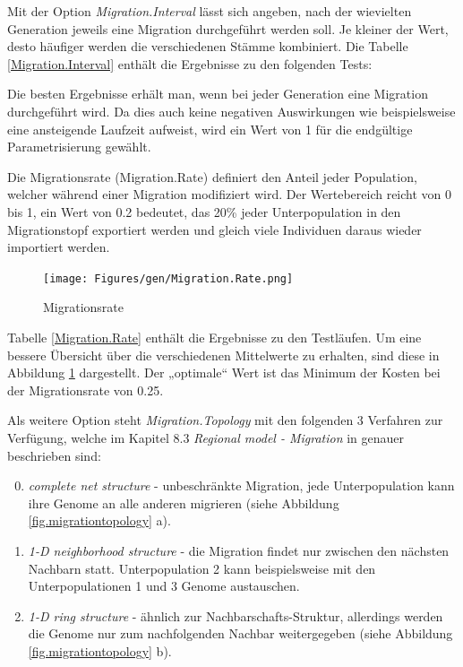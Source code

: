 
Mit der Option \emph{Migration.Interval} lässt sich angeben, nach der wievielten
Generation jeweils eine Migration durchgeführt werden soll. Je kleiner der Wert,
desto häufiger werden die verschiedenen Stämme kombiniert. Die Tabelle
\ref{Migration.Interval} enthält die Ergebnisse zu den folgenden Tests:




\noindent Die besten Ergebnisse erhält man, wenn bei jeder Generation eine
Migration durchgeführt wird. Da dies auch keine negativen Auswirkungen wie
beispielsweise eine ansteigende Laufzeit aufweist, wird ein Wert von 1 für die
endgültige Parametrisierung gewählt.


Die Migrationsrate (Migration.Rate) definiert den Anteil jeder Population, welcher
während einer Migration modifiziert wird. Der Wertebereich reicht von 0 bis 1,
ein Wert von 0.2 bedeutet, das 20\% jeder Unterpopulation in den Migrationstopf
exportiert werden und gleich viele Individuen daraus wieder importiert werden.


\begin{figure}[h!]
  \centering
  \texttt{[image: Figures/gen/Migration.Rate.png]}
  \caption{Migrationsrate}\label{fig.migrationrate}
\end{figure}

\noindent Tabelle \ref{Migration.Rate} enthält die Ergebnisse zu den Testläufen.
Um eine bessere Übersicht über die verschiedenen Mittelwerte zu erhalten, sind
diese in Abbildung \ref{fig.migrationrate} dargestellt. Der „optimale“ Wert
ist das Minimum der Kosten bei der Migrationsrate von 0.25.


Als weitere Option steht \emph{Migration.Topology} mit den folgenden 3 Verfahren
zur Verfügung, welche im Kapitel 8.3 \emph{Regional model - Migration} in
\citep{geatbx-ea} genauer beschrieben sind:
\begin{enumerate}
\setcounter{enumi}{-1} %
\item \emph{complete net structure} - unbeschränkte Migration, jede
      Unterpopulation kann ihre Genome an alle anderen migrieren (siehe Abbildung
      \ref{fig.migrationtopology} a).
\item \emph{1-D neighborhood structure} - die Migration findet nur zwischen den
      nächsten Nachbarn statt. Unterpopulation 2 kann beispielsweise mit den
      Unterpopulationen 1 und 3 Genome austauschen.
\item \emph{1-D ring structure} - ähnlich zur Nachbarschafts-Struktur, allerdings
      werden die Genome nur zum nachfolgenden Nachbar weitergegeben (siehe Abbildung
      \ref{fig.migrationtopology} b).
\end{enumerate}

